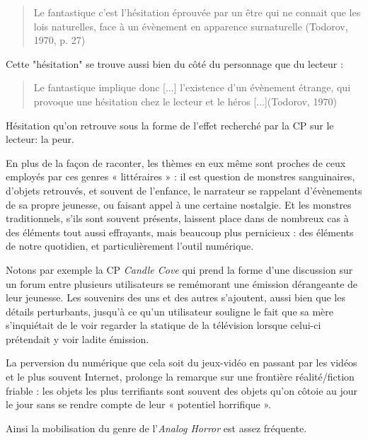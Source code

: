 \documentclass[12pt,a4paper,oneside,titlepage]{article} %
\begin{document}
	\begin{quotation}
Le fantastique c’est l’hésitation éprouvée par un être qui ne connait que les lois naturelles, face à un évènement en apparence surnaturelle (Todorov, 1970, p. 27)\newline
	\end{quotation}

Cette "hésitation" se trouve aussi bien du côté du personnage que du lecteur : 
\begin{quotation}
	Le fantastique implique donc [...] l’existence d’un évènement étrange, qui provoque une hésitation chez le lecteur et le héros [...](Todorov, 1970)
\end{quotation}

Hésitation qu'on retrouve sous la forme de l'effet recherché par la CP sur le lecteur: la peur.

\par
En plus de la façon de raconter, les thèmes en eux même sont proches de ceux employés par ces genres « littéraires » : il est question de monstres sanguinaires, d’objets retrouvés, et souvent de l’enfance, le narrateur se rappelant d’évènements de sa propre jeunesse, ou faisant appel à une certaine nostalgie. Et les monstres traditionnels, s’ils sont souvent présents, laissent place dans de nombreux cas à des éléments tout aussi effrayants, mais beaucoup plus pernicieux : des éléments de notre quotidien, et particulièrement l’outil numérique. 
\par
Notons par exemple la CP \emph{Candle Cove} qui prend la forme d’une discussion sur un forum entre plusieurs utilisateurs se remémorant une émission dérangeante de leur jeunesse. Les souvenirs des uns et des autres s’ajoutent, aussi bien que les détails perturbants, jusqu’à ce qu’un utilisateur souligne le fait que sa mère s’inquiétait de le voir regarder la statique de la télévision lorsque celui-ci prétendait y voir ladite émission. 
\par
La perversion du numérique que cela soit du jeux-vidéo en passant par les vidéos et le plus souvent Internet, prolonge la remarque sur une frontière réalité/fiction friable : les objets les plus terrifiants sont souvent des objets qu’on côtoie au jour le jour sans se rendre compte de leur « potentiel horrifique ».
\par
Ainsi la mobilisation du genre de l’\emph{Analog Horror }est assez fréquente. 
\end{document}
